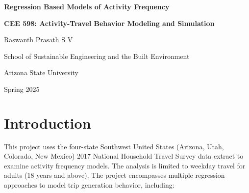 \documentclass[12pt]{article}
\begin{document}

\thispagestyle{empty}

\begin{center}
    \vspace*{1.5cm}
    
    \textbf{\Large Regression Based Models of Activity Frequency}
    
    \vspace{6cm}
    
    \textbf{\Large CEE 598: Activity-Travel Behavior Modeling and Simulation}
    
    \vspace{6cm}
    
    \large{Raswanth Prasath S V}
    
    \vspace{0.5cm}
    
    \large{School of Sustainable Engineering and the Built Environment}
    
    \large{Arizona State University}
    
    \vspace{2cm}
    
    \large{Spring 2025}
    
    \vfill
    
\end{center}

\newpage
{}

\tableofcontents
\newpage

\listoffigures

\listoftables
\newpage


\section{Introduction}

This project uses the four-state Southwest United States (Arizona, Utah, Colorado, New Mexico) 2017 National Household Travel Survey data extract to examine activity frequency models. The analysis is limited to weekday travel for adults (18 years and above). The project encompasses multiple regression approaches to model trip generation behavior, including:
\end{document}
